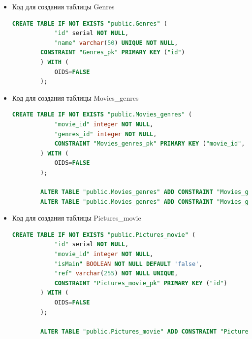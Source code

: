 \documentclass[a4paper,12pt]{article}
\renewcommand{\^}[2]{#1^{\, #2} \kern -1pt}
\newcommand{\1}{\kern 1pt}
\newcommand{\0}{\kern -1pt}
\begin{document}
\begin{itemize}
	\begin{lstlisting}[style=vscode-dark, language=SQL, label={lst:sql}]
		CREATE TABLE IF NOT EXISTS "public.Movies" (
			"id" serial NOT NULL,
			"name" varchar(255) NOT NULL,
			"release_date" DATE,
			"duration" TIME NOT NULL,
			"mpaa" varchar(10),
			"rating" float4,
			"kp_id" varchar(255),
			"description" TEXT,
			CONSTRAINT "Movies_pk" PRIMARY KEY ("id")
		) WITH (
			OIDS=FALSE
		);
	\end{lstlisting}


	\item Код для создания таблицы Genres

	\begin{lstlisting}[style=vscode-dark, language=SQL, label={lst:sql2}]
		CREATE TABLE IF NOT EXISTS "public.Genres" (
			"id" serial NOT NULL,
			"name" varchar(50) UNIQUE NOT NULL,
		CONSTRAINT "Genres_pk" PRIMARY KEY ("id")
		) WITH (
			OIDS=FALSE
		);
	\end{lstlisting}

	\item Код для создания таблицы Movies\_genres

	\begin{lstlisting}[style=vscode-dark, language=SQL, label={lst:sql3}]
		CREATE TABLE IF NOT EXISTS "public.Movies_genres" (
			"movie_id" integer NOT NULL,
			"genres_id" integer NOT NULL,
			CONSTRAINT "Movies_genres_pk" PRIMARY KEY ("movie_id", "genres_id")
		) WITH (
			OIDS=FALSE
		);
		
		ALTER TABLE "public.Movies_genres" ADD CONSTRAINT "Movies_genres_fk0" FOREIGN KEY ("movie_id") REFERENCES "public.Movies"("id");
		ALTER TABLE "public.Movies_genres" ADD CONSTRAINT "Movies_genres_fk1" FOREIGN KEY ("genres_id") REFERENCES "public.Genres"("id");
	\end{lstlisting}

	\item Код для создания таблицы Pictures\_movie

	\begin{lstlisting}[style=vscode-dark, language=SQL, label={lst:sql4}]
		CREATE TABLE IF NOT EXISTS "public.Pictures_movie" (
			"id" serial NOT NULL,
			"movie_id" integer NOT NULL,
			"isMain" BOOLEAN NOT NULL DEFAULT 'false',
			"ref" varchar(255) NOT NULL UNIQUE,
			CONSTRAINT "Pictures_movie_pk" PRIMARY KEY ("id")
		) WITH (
			OIDS=FALSE
		);
		
		ALTER TABLE "public.Pictures_movie" ADD CONSTRAINT "Pictures_movie_fk0" FOREIGN KEY ("movie_id") REFERENCES "public.Movies"("id");
	\end{lstlisting}
	

\end{itemize}
\end{document}

